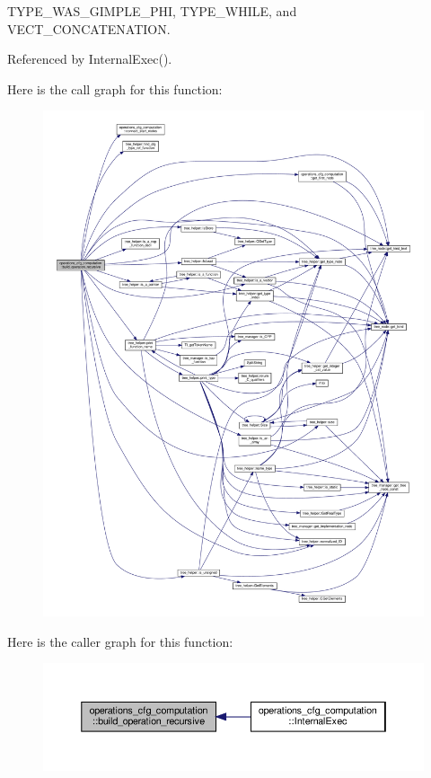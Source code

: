 T\+Y\+P\+E\+\_\+\+W\+A\+S\+\_\+\+G\+I\+M\+P\+L\+E\+\_\+\+P\+HI, T\+Y\+P\+E\+\_\+\+W\+H\+I\+LE, and V\+E\+C\+T\+\_\+\+C\+O\+N\+C\+A\+T\+E\+N\+A\+T\+I\+ON.



Referenced by Internal\+Exec().

Here is the call graph for this function\+:
\nopagebreak
\begin{figure}[H]
\begin{center}
\leavevmode
\includegraphics[width=350pt]{d0/d11/classoperations__cfg__computation_a15f7edea4fa3125578040172ac73c006_cgraph}
\end{center}
\end{figure}
Here is the caller graph for this function\+:
\nopagebreak
\begin{figure}[H]
\begin{center}
\leavevmode
\includegraphics[width=350pt]{d0/d11/classoperations__cfg__computation_a15f7edea4fa3125578040172ac73c006_icgraph}
\end{center}
\end{figure}
